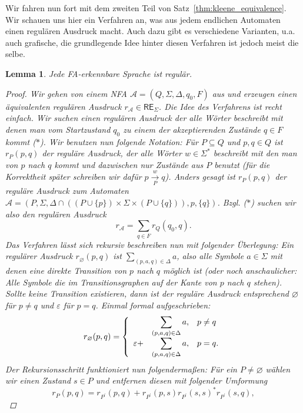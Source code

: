 \documentclass[11pt, a4paper]{article}
\theoremstyle{definition}
\theoremstyle{plain}
\newtheorem{lemma}[definition]{Lemma}
\numberwithin{equation}{section}
\newcommand{\reachess}[2]{\overset{#1}{\underset{#2}{\rightarrow}}}
\let\emptyset\varnothing
\begin{document}
Wir fahren nun fort mit dem zweiten Teil von Satz~\ref{thm:kleene_equivalence}. Wir schauen uns hier ein Verfahren an, was aus jedem endlichen Automaten einen regulären Ausdruck macht. Auch dazu gibt es verschiedene Varianten, u.a. auch grafische, die grundlegende Idee hinter diesen Verfahren ist jedoch meist die selbe.
\begin{lemma}\label{lem:nfa2regex}
	Jede FA-erkennbare Sprache ist regulär.
	\begin{proof}
		Wir gehen von einem NFA $\mathcal{A} = (Q, \Sigma, \Delta, q_0, F)$ aus und erzeugen einen ä\-qui\-va\-len\-ten regulären Ausdruck $r_\mathcal{A} \in \mathsf{RE}_\Sigma$. Die Idee des Verfahrens ist recht einfach. Wir suchen einen regulären Ausdruck der alle Wörter beschreibt mit denen man vom Startzustand $q_0$ zu einem der akzeptierenden Zustände $q \in F$ kommt ($\ast$). Wir benutzen nun folgende Notation: Für $P \subseteq Q$ und $p, q \in Q$ ist $r_P(p, q)$ der reguläre Ausdruck, der alle Wörter $w \in \Sigma^\ast$ beschreibt mit den man von $p$ nach $q$ kommt und dazwischen nur Zustände aus $P$ benutzt (für die Korrektheit später schreiben wir dafür $p \reachess{w}{P} q$). Anders gesagt ist $r_P(p, q)$ der reguläre Ausdruck zum Automaten $\mathcal{A} = (P, \Sigma, \Delta \cap ((P \cup \{p\}) \times \Sigma \times (P \cup \{q\})), p, \{q\})$. Bzgl. ($\ast$) suchen wir also den regulären Ausdruck
		$$
			r_\mathcal{A} = \sum_{q \in F} r_Q(q_0, q).
		$$
		Das Verfahren lässt sich rekursiv beschreiben nun mit folgender Überlegung: Ein regulärer Ausdruck $r_\emptyset(p, q)$ ist $\sum_{(p, a, q) \in \Delta} a$, also alle Symbole $a \in \Sigma$ mit denen eine direkte Transition von $p$ nach $q$ möglich ist (oder noch anschaulicher: Alle Symbole die im Transitionsgraphen auf der Kante von $p$ nach $q$ stehen). Sollte keine Transition existieren, dann ist der reguläre Ausdruck entsprechend $\emptyset$ für $p \neq q$ und $\varepsilon$ für $p = q$. Einmal formal aufgeschrieben:
		$$
			r_\emptyset(p, q) = \left\lbrace
				\begin{array}{*3{>{\displaystyle}l}p{5cm}}
					\ &\sum_{(p, a, q) \in \Delta} a, & p \neq q\\
					\varepsilon + &\sum_{(p, a, q) \in \Delta} a, & p = q.
				\end{array}
			\right.
		$$
		Der Rekursionsschritt funktioniert nun folgendermaßen: Für ein $P \neq \emptyset$ wählen wir einen Zustand  $s \in P$ und entfernen diesen mit folgender Umformung
		$$
			r_P(p, q) = r_{P^\prime}(p, q) + r_{P^\prime}(p, s) r_{P^\prime}(s, s)^\ast r_{P^\prime}(s, q),
$$
\end{proof}
\end{lemma}
\end{document}

